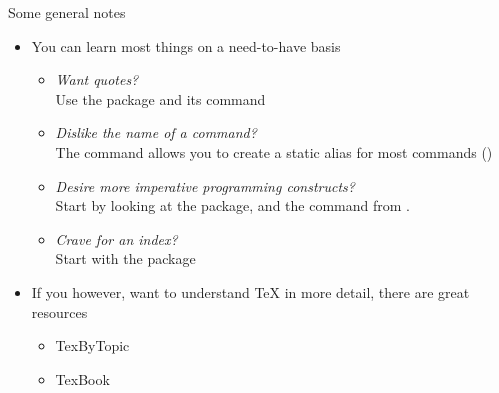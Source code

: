 \begin{frame}{Some general notes}
   \begin{itemize}
      \item You can learn most things on a need-to-have basis
         \begin{itemize}
            \item \textit{Want quotes?}\\
                  Use the \CsquotesPkg package and its \blatex{\\enquote} command
            \item \textit{Dislike the name of a command?}\\
                  The \blatex{\\let} command allows you to create a static alias for most commands (\blatex{\\let\\say\\enquote})
            \item \textit{Desire more imperative programming constructs?}\\
                  Start by looking at the \EtoolboxPkg package, and the \blatex{\\foreach} command from \TikyPkg.
            \item \textit{Crave for an index?}\\
                  Start with the \ImakeidxPkg package
         \end{itemize}
      \item If you however, want to understand \TeX{} in more detail, there are great resources \begin{itemize}
         \item TexByTopic
         \item TexBook
      \end{itemize}
   \end{itemize}
\end{frame}

